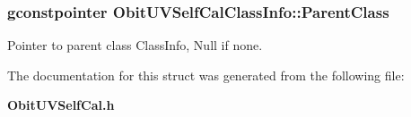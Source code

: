 \subsubsection{\setlength{\rightskip}{0pt plus 5cm}gconstpointer {\bf Obit\-UVSelf\-Cal\-Class\-Info::Parent\-Class}}\label{structObitUVSelfCalClassInfo_o3}


Pointer to parent class Class\-Info, Null if none. 



The documentation for this struct was generated from the following file:\begin{CompactItemize}
\item 
{\bf Obit\-UVSelf\-Cal.h}\end{CompactItemize}
